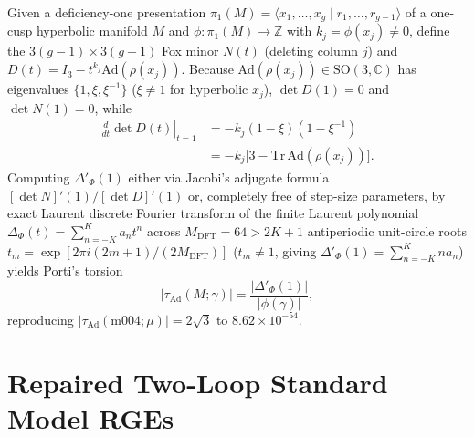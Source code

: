 \documentclass[aps,prd,twocolumn,nofootinbib,floatfix]{revtex4-2}
\begin{document}
Given a deficiency-one presentation $\pi_1(M) = \langle x_1,\dots,x_g \mid r_1,\dots,r_{g-1} \rangle$ of a one-cusp hyperbolic manifold $M$ and $\phi: \pi_1(M) \to \mathbb{Z}$ with $k_j = \phi(x_j) \ne 0$, define the $3(g-1)\times 3(g-1)$ Fox minor $N(t)$ (deleting column $j$) and $D(t) = I_3 - t^{k_j}\mathrm{Ad}(\rho(x_j))$.
Because $\mathrm{Ad}(\rho(x_j)) \in \mathrm{SO}(3,\mathbb{C})$ has eigenvalues $\{1, \xi, \xi^{-1}\}$ ($\xi \ne 1$ for hyperbolic $x_j$), $\det D(1) = 0$ and $\det N(1) = 0$, while
\begin{align}
\label{eq:d_prime_1}
\left.\frac{d}{dt}\det D(t)\right|_{t=1} &= -k_j(1 - \xi)(1 - \xi^{-1}) \nonumber\\
&= -k_j\bigl[3 - \mathrm{Tr}\,\mathrm{Ad}(\rho(x_j))\bigr].
\end{align}
Computing $\Delta'_{\Phi}(1)$ either via Jacobi's adjugate formula $[\det N]'(1)/[\det D]'(1)$ or, completely free of step-size parameters, by exact Laurent discrete Fourier transform of the finite Laurent polynomial $\Delta_{\Phi}(t) = \sum_{n=-K}^K a_n t^n$ across $M_{\mathrm{DFT}} = 64 > 2K + 1$ antiperiodic unit-circle roots $t_m = \exp[2\pi i(2m+1)/(2M_{\mathrm{DFT}})]$ ($t_m \ne 1$, giving $\Delta'_{\Phi}(1) = \sum_{n=-K}^K n a_n$) yields Porti's torsion~\cite{Porti1997,DuboisYamaguchi2009}
\begin{equation}
\label{eq:tau_porti_explicit}
\bigl|\tau_{\mathrm{Ad}}(M;\gamma)\bigr| = \frac{\bigl|\Delta'_{\Phi}(1)\bigr|}{|\phi(\gamma)|},
\end{equation}
reproducing $|\tau_{\mathrm{Ad}}(\mathrm{m004};\mu)| = 2\sqrt{3}$ to $8.62\times 10^{-54}$.

\section{Repaired Two-Loop Standard Model RGEs}
\label{app:rge}
\end{document}

